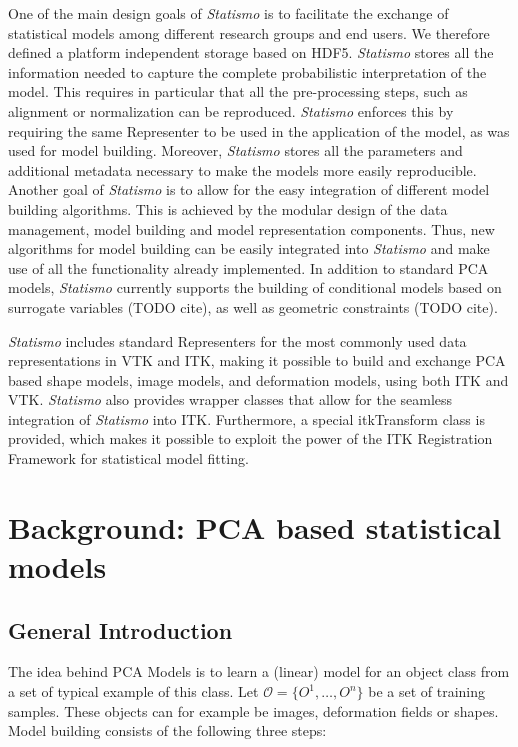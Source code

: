 \documentclass{InsightArticle}
\newcommand{\Statismo}{\emph{Statismo}\xspace}
\begin{document}
One of the main design goals of \Statismo is to facilitate the exchange of
statistical models among different research groups and end users. We therefore
defined a platform independent storage based on HDF5. \Statismo stores all the 
information needed to capture the complete probabilistic interpretation of the model.
This requires in particular that all the pre-processing steps, such as alignment or normalization 
can be reproduced. \Statismo enforces this by requiring the same Representer to be used 
in the application of the model, as was used for model building. Moreover, \Statismo stores
all the parameters and additional metadata necessary to make the models more easily reproducible. 
Another goal of \Statismo is to allow for the easy integration of
different model building algorithms. This is achieved by the modular design of the data management, model building and model representation components. Thus, new algorithms for model building can be easily
integrated into \Statismo and make use of all the functionality
already implemented.  In addition to  standard PCA models, \Statismo
currently supports the building of conditional models based on surrogate
variables (TODO cite), as well as geometric constraints (TODO cite).

\Statismo includes standard Representers for the most commonly used
data representations in VTK and ITK, making it possible to build and
exchange PCA based shape models, image models, and deformation models,
using both ITK and VTK. \Statismo also provides wrapper classes that
allow for the seamless integration of \Statismo into ITK. Furthermore,
a special itkTransform class is provided, which makes it possible 
to exploit the power of the  ITK Registration Framework for
statistical model fitting.


\section{Background: PCA based statistical models}
\subsection{General Introduction}\label{sec:pca-models}
The idea behind PCA Models is to learn a (linear) model for an object class from a set of
typical example of this class. Let $\mathcal{O} = \{O^1, \ldots,
O^n\}$ be a set of training samples. These
objects can for example be images, deformation fields or shapes. Model
building consists of the following three steps:
\end{document}
